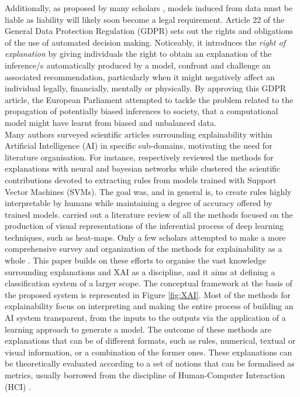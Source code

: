 \documentclass[final,1p,times]{elsarticle}
\begin{document}
Additionally, as proposed by many scholars \cite{dovsilovic2018explainable,thelisson2017regulatory} \cite{thelisson2017towards,wachter2017transparent}, models induced from data must be liable as liability will likely soon become a legal requirement. Article 22 of the General Data Protection Regulation (GDPR)
sets out the rights and obligations of the use of automated decision making. Noticeably, it introduces the \textit{right of explanation} by giving individuals the right to obtain an explanation of the inference/s automatically produced by a model, confront and challenge an associated recommendation, particularly when it might negatively affect an individual legally, financially, mentally or physically. By approving this GDPR article, the European Parliament attempted to tackle the problem related to the propagation of potentially biased inferences to society, that a computational model might have learnt from biased and unbalanced data.\\

Many authors surveyed scientific articles surrounding explainability within Artificial Intelligence (AI) in specific sub-domains, motivating the need for literature organisation. For instance, \cite{samek2019towards,lacave2002review} respectively reviewed the methods for explanations with neural and bayesian networks while \cite{martens2007comprehensible} clustered the scientific contributions devoted to extracting rules from models trained with Support Vector Machines (SVMs). The goal was, and in general is, to create rules highly interpretable by humans while maintaining a degree of accuracy offered by trained models. \cite{choo2018visual} carried out a literature review of all the methods focused on the production of visual representations of the inferential process of deep learning techniques, such as heat-maps. Only a few scholars attempted to make a more comprehensive survey and organization of the methods for explainability as a whole \cite{adadi2018peeking,guidotti2018survey}.  
This paper builds on these efforts to organise the vast knowledge surrounding explanations and XAI as a discipline, and it aims at defining a classification system of a larger scope.
The conceptual framework at the basis of the proposed system is represented in Figure \ref{fig:XAI}. Most of the methods for explainability focus on interpreting and making the entire process of building an AI system transparent, from the inputs to the outputs via the application of a learning approach to generate a model. The outcome of these methods are explanations that can be of different formats, such as rules, numerical, textual or visual information, or a combination of the former ones. These explanations can be theoretically evaluated according to a set of notions that can be formalised as metrics, usually borrowed from the discipline of Human-Computer Interaction (HCI) \cite{miller2017explanation}.\\
\end{document}
